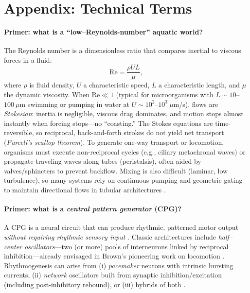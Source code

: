 \section*{Appendix: Technical Terms}\label{appendix}

\paragraph{Primer: what is a ``low–Reynolds-number'' aquatic world?}\label{reynolds-number}
The Reynolds number is a dimensionless ratio that compares inertial to viscous forces in a fluid:
\[
\mathrm{Re}=\frac{\rho U L}{\mu},
\]
where $\rho$ is fluid density, $U$ a characteristic speed, $L$ a characteristic length, and $\mu$ the dynamic viscosity. 
When $\mathrm{Re}\ll 1$ (typical for microorganisms with $L\sim 10$–$100~\mu$m swimming or pumping in water at $U\sim 10^2$–$10^3~\mu$m/s), flows are \emph{Stokesian}: inertia is negligible, viscous drag dominates, and motion stops almost instantly when forcing stops—no ``coasting.'' 
The Stokes equations are time-reversible, so reciprocal, back-and-forth strokes do not yield net transport (\emph{Purcell’s scallop theorem}). 
To generate one-way transport or locomotion, organisms must execute non-reciprocal cycles (e.g., ciliary metachronal waves) or propagate traveling waves along tubes (peristalsis), often aided by valves/sphincters to prevent backflow. 
Mixing is also difficult (laminar, low turbulence), so many systems rely on continuous pumping and geometric gating to maintain directional flows in tubular architectures \citep{Purcell1977LowRe, BrennenWinet1977CiliaFlagella, LaugaPowers2009MicroSwimmers, Guasto2012Planktonic, Vogel1994LifeMovingFluids, Shapiro1969Peristalsis}.


\paragraph{Primer: what is a \emph{central pattern generator} (CPG)?}\label{CPG}
A CPG is a neural circuit that can produce rhythmic, patterned motor output \emph{without requiring rhythmic sensory input} \citep{MarderCalabrese1996PR,MarderBucher2001CB}. Classic architectures include \emph{half–center oscillators}—two (or more) pools of interneurons linked by reciprocal inhibition—already envisaged in Brown’s pioneering work on locomotion \citep{Brown1911IntrinsicProgression}. Rhythmogenesis can arise from (i) \textit{pacemaker} neurons with intrinsic bursting currents, (ii) \textit{network} oscillators built from synaptic inhibition/excitation (including post-inhibitory rebound), or (iii) hybrids of both \citep{Grillner2006Neuron,Kiehn2016NRN}. 

